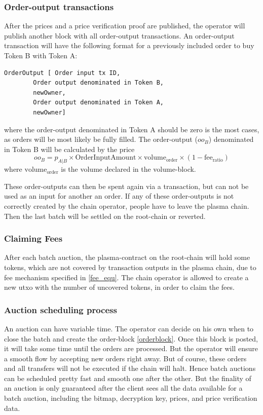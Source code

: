 \documentclass[11pt,parskip=full]{scrartcl}%
\begin{document}
\subsubsection{Order-output transactions} After the prices and a price verification proof are published, the operator will publish another block with all order-output transactions. An order-output transaction will have the following format for a previously included order to buy Token B with Token A:
\begin{lstlisting}
OrderOutput [ Order input tx ID,
		Order output denominated in Token B, 
		newOwner,
		Order output denominated in Token A,
		newOwner]

\end{lstlisting}
where the order-output denominated in Token A should be zero is the most cases, as orders will be most likely be fully filled.
The order-output ($oo_B$) denominated in Token B will be calculated by the price 
\begin{equation}
	oo_B = p_{A|B} \times \text{OrderInputAmount} \times \text{volume}_{\text{order}} \times (1-\text{fee}_{\text{ratio}})
    \label{fee_equ}
\end{equation}
where $\text{volume}_{\text{order}}$ is the volume declared in the volume-block.  

These order-outputs can then be spent again via a transaction, but can not be used as an input for another an order.
If any of these order-outputs is not correctly created by the chain operator, people have to leave the plasma chain. Then the last batch will be settled on the root-chain or reverted.

\subsubsection{Claiming Fees} After each batch auction, the plasma-contract on the root-chain will hold some tokens, which are not covered by transaction outputs in the plasma chain, due to fee mechanism specified in \ref{fee_equ}. The chain operator is allowed to create a new utxo with the number of uncovered tokens, in order to claim the fees.

\subsubsection{Auction scheduling process}
An auction can have variable time. The operator can decide on his own when to close the batch and create the order-block \ref{orderblock}. Once this block is posted, it will take some time until the orders are processed. But the operator will ensure a smooth flow by accepting new orders right away. But of course, these orders and all transfers will not be executed if the chain will halt.
Hence batch auctions can be scheduled pretty fast and smooth one after the other. But the finality of an auction is only guaranteed after the client sees all the data available for a batch auction, including the bitmap, decryption key, prices, and price verification data.  
\end{document}
